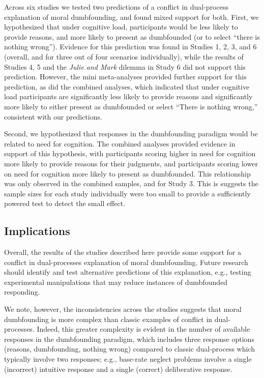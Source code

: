 \documentclass[
  american,
  man,floatsintext]{apa7}
\begin{document}
Across six studies we tested two predictions of a conflict in dual-process explanation of moral dumbfounding, and found mixed support for both. First, we hypothesized that under cognitive load, participants would be less likely to provide reasons, and more likely to present as dumbfounded (or to select ``there is nothing wrong''). Evidence for this prediction was found in Studies 1, 2, 3, and 6 (overall, and for three out of four scenarios individually), while the results of Studies 4, 5 and the \emph{Julie and Mark} dilemma in Study 6 did not support this prediction. However, the mini meta-analyses provided further support for this prediction, as did the combined analyses, which indicated that under cognitive load participants are significantly less likely to provide reasons and significantly more likely to either present as dumbfounded or select ``There is nothing wrong,'' consistent with our predictions.

Second, we hypothesized that responses in the dumbfounding paradigm would be related to need for cognition. The combined analyses provided evidence in support of this hypothesis, with participants scoring higher in need for cognition more likely to provide reasons for their judgments, and participants scoring lower on need for cognition more likely to present as dumbfounded. This relationship was only observed in the combined samples, and for Study 3. This is suggests the sample sizes for each study individually were too small to provide a sufficiently powered test to detect the small effect.

\hypertarget{implications}{%
\subsection{Implications}\label{implications}}

Overall, the results of the studies described here provide some support for a conflict in dual-processes explanation of moral dumbfounding. Future research should identify and test alternative predictions of this explanation, e.g., testing experimental manipulations that may reduce instances of dumbfounded responding.

We note, however, the inconsistencies across the studies suggests that moral dumbfounding is more complex than classic examples of conflict in dual-processes. Indeed, this greater complexity is evident in the number of available responses in the dumbfounding paradigm, which includes three response options (reasons, dumbfounding, nothing wrong) compared to classic dual-process which typically involve two responses; e.g., base-rate neglect problems involve a single (incorrect) intuitive response and a single (correct) deliberative response.
\end{document}
